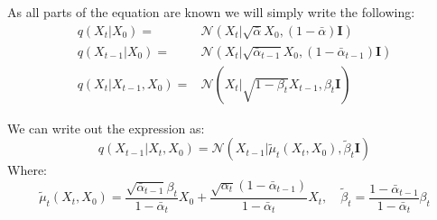 \documentclass[12pt]{article}    %
\begin{document}
\exminor
As all parts of the equation are known we will simply write the following:
\begin{align}
    q(X_t|X_0) =& \mathcal{N}(X_t| \sqrt{\bar{\alpha}}X_0, (1-\bar{\alpha})\mathbf{I}) \\
    q(X_{t-1}|X_0) =& \mathcal{N}(X_t| \sqrt{\bar{\alpha}_{t-1}}X_0, (1-\bar{\alpha}_{t-1})\mathbf{I})\\
    q(X_t|X_{t-1},X_0) =& \mathcal{N}(X_t| \sqrt{1-\beta_t}X_{t-1}, \beta_t \mathbf{I})
\end{align}

\exminor
We can write out the expression as:
\begin{equation} \label{eq:forward-process-distribution}
    q(X_{t-1}|X_{t}, X_0) = \mathcal{N}(X_{t-1}| \tilde{\mu}_t(X_t, X_0), \tilde{\beta}_t \mathbf{I})
\end{equation}
Where:
\begin{equation*}
    \tilde{\mu}_t(X_t, X_0) = \frac{\sqrt{\bar{\alpha}_{t-1}}\beta_t}{1-\bar{\alpha}_t}X_0 + \frac{\sqrt{\alpha_t}(1-\bar{\alpha}_{t-1})}{1-\bar{\alpha}_t}X_t, \quad \tilde{\beta}_t = \frac{1-\bar{\alpha}_{t-1}}{1-\bar{\alpha}_t}\beta_t
\end{equation*}
\end{document}
